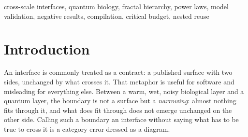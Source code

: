 \documentclass[conference]{IEEEtran}
\theoremstyle{definition}
\begin{document}
\begin{abstract}
refutation forbids in cost per unit depth reappears, correctly placed, in reach per
unit budget; and seamlessness is the limit $\rho\to0$ of the compiled share, not a
property any drifting system holds. Turning that mechanism into a decision adds the
paper's only threshold with a closed form---and a negative result attached to it. A
compiled path that carries a fixed premium $S$ repays it only above
$B^{*}=c_v+S\,G_\infty/(G_\infty-1)$, a line whose intercept is the price of one
crossing and whose slope is fixed by the same price ratio; a monitor makes the
threshold rise with drift to a vertical asymptote at $\rho=1-c_d/(c_v-c_c)$. With
no premium the threshold collapses to $c_v$ itself, so the natural intuition---an
upfront verification makes compiling lose at small budgets---is false, and the
compiled system is never behind anywhere. Reach then tells the opposite story to
depth: the depth advantage grows without bound, while the reach advantage peaks at a
finite budget and returns to one at the horizon. We also prove that, unlike simple
amortisation---bounded at $G=\nestedGain$---the cross-layer reuse rate $\kappa$ is
the source of genuine exponential compound interest in interface evolution: the
marginal cost of a task spanning $d$ levels grows with base
$\min\!\bigl(L,1/(1-\kappa)\bigr)$, so compounding disappears below
$\kappa^{*}=1-1/L$ and saturates above it. We state explicitly what these
experiments do \emph{not} show.
\end{abstract}

\begin{IEEEkeywords}
cross-scale interfaces, quantum biology, fractal hierarchy, power laws, model
validation, negative results, compilation, critical budget, nested reuse
\end{IEEEkeywords}

\section{Introduction}

An interface is commonly treated as a contract: a published surface with two
sides, unchanged by what crosses it. That metaphor is useful for software and
misleading for everything else. Between a warm, wet, noisy biological layer and a
quantum layer, the boundary is not a surface but a \emph{narrowing}: almost nothing
fits through it, and what does fit through does not emerge unchanged on the other
side. Calling such a boundary an interface without saying what has to be true to
cross it is a category error dressed as a diagram.
\end{document}
